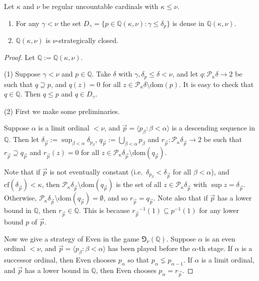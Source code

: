 \documentclass[10pt,a4paper]{amsart}
\newcommand{\cof}{\mathrm{cf}}
\newcommand{\dom}{\mathrm{dom}}
\newcommand{\mbb}{\mathbb}
\newcommand{\mcal}{\mathcal}
\begin{document}
\begin{lemma} \label{lem:Q_basics}
Let $\kappa$ and $\nu$ be regular uncountable cardinals with $\kappa \leq \nu$.
\begin{enumerate}
\item For any $\gamma < \nu$ the set $D_\gamma = \{ p \in \mbb{Q} ( \kappa , \nu ) : \gamma \leq \delta_p \}$ is dense in $\mbb{Q} ( \kappa , \nu )$.
\item $\mbb{Q} ( \kappa , \nu )$ is $\nu$-strategically closed.
\end{enumerate}
\end{lemma}

\begin{proof}
Let $\mbb{Q} := \mbb{Q} ( \kappa , \nu )$.

\medskip
\noindent
(1) Suppose $\gamma < \nu$ and $p \in \mbb{Q}$. Take $\delta$ with $\gamma , \delta_p \leq \delta < \nu$, and let $q : \mcal{P}_\kappa \delta \to 2$ be such that $q \supseteq p$, and $q(z) = 0$ for all $z \in \mcal{P}_\kappa \delta \setminus \dom (p)$. It is easy to check that $q \in \mbb{Q}$. Then $q \leq p$ and $q \in D_\gamma$.

\medskip
\noindent
(2) First we make some preliminaries.

Suppose $\alpha$ is a limit ordinal $< \nu$, and $\vec{p} = \langle p_\beta : \beta < \alpha \rangle$ is a descending sequence in $\mbb{Q}$. Then let $\delta_{\vec{p}} := \sup_{\beta < \alpha} \delta_{p_\beta}$, $q_{\vec{p}} := \bigcup_{\beta < \alpha} p_\beta$ and $r_{\vec{p}} : \mcal{P}_\kappa \delta_{\vec{p}} \to 2$ be such that $r_{\vec{p}} \supseteq q_{\vec{p}}$ and $r_{\vec{p}} (z) = 0$ for all $z \in \mcal{P}_\kappa \delta_{\vec{p}} \setminus \dom ( q_{\vec{p}} )$.

Note that if $\vec{p}$ is not eventually constant (i.e.~$\delta_{p_\beta} < \delta_{\vec{p}}$ for all $\beta < \alpha$), and $\cof ( \delta_{\vec{p}} ) < \kappa$, then $\mcal{P}_\kappa \delta_{\vec{p}} \setminus \dom ( q_{\vec{p}} )$ is the set of all $z \in \mcal{P}_\kappa \delta_{\vec{p}}$ with $\sup z = \delta_{\vec{p}}$. Otherwise, $\mcal{P}_\kappa \delta_{\vec{p}} \setminus \dom ( q_{\vec{p}} ) = \emptyset$, and so $r_{\vec{p}} = q_{\vec{p}}$.
Note also that if $\vec{p}$ has a lower bound in $\mbb{Q}$, then $r_{\vec{p}} \in \mbb{Q}$. This is because ${r_{\vec{p}}}^{-1} (1) \subseteq p^{-1} (1)$ for any lower bound $p$ of $\vec{p}$.

Now we give a strategy of Even in the game $\Game_\nu ( \mbb{Q} )$. Suppose $\alpha$ is an even ordinal $< \nu$, and $\vec{p} = \langle p_\beta : \beta < \alpha \rangle$ has been played before the $\alpha$-th stage. If $\alpha$ is a successor ordinal, then Even chooses $p_\alpha$ so that $p_\alpha \lneq p_{\alpha -1}$. If $\alpha$ is a limit ordinal, and $\vec{p}$ has a lower bound in $\mbb{Q}$, then Even chooses $p_\alpha = r_{\vec{p}}$.


\end{proof}
\end{document}
